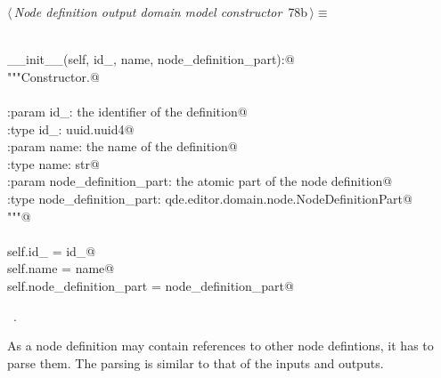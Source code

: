 \documentclass[
    a4paper,      %
    10pt,         %
    openright,    %
    notitlepage,  %
    parskip=half, %
]{scrreprt}       %
\theoremstyle{definition}                    %
\begin{document}
\begin{flushleft} \small
\begin{minipage}{\linewidth}\label{scrap129}\raggedright\small
{} $\langle\,${\itshape Node definition output domain model constructor}\nobreak\ {\footnotesize {78b}}$\,\rangle\equiv$
\vspace{-1exm}
\begin{list}{}{} \item
\mbox{}\lstinline@@\\
\mbox{}\lstinline@def __init__(self, id_, name, node_definition_part):@\\
\mbox{}\lstinline@    """Constructor.@\\
\mbox{}\lstinline@@\\
\mbox{}\lstinline@    :param id_: the identifier of the definition@\\
\mbox{}\lstinline@    :type  id_: uuid.uuid4@\\
\mbox{}\lstinline@    :param name: the name of the definition@\\
\mbox{}\lstinline@    :type  name: str@\\
\mbox{}\lstinline@    :param node_definition_part: the atomic part of the node definition@\\
\mbox{}\lstinline@    :type node_definition_part: qde.editor.domain.node.NodeDefinitionPart@\\
\mbox{}\lstinline@    """@\\
\mbox{}\lstinline@@\\
\mbox{}\lstinline@    self.id_                  = id_@\\
\mbox{}\lstinline@    self.name                 = name@\\
\mbox{}\lstinline@    self.node_definition_part = node_definition_part@{\NWsep}
\end{list}
\vspace{-1.5ex}
\footnotesize
\begin{list}{}{\setlength{\itemsep}{-\parsep}\setlength{\itemindent}{-\leftmargin}}
\item \NWtxtMacroRefIn\ .

\item{}
\end{list}
\end{minipage}\vspace{4ex}
\end{flushleft}
As a node definition may contain references to other node defintions, it has to
parse them. The parsing is similar to that of the inputs and outputs.
\end{document}
